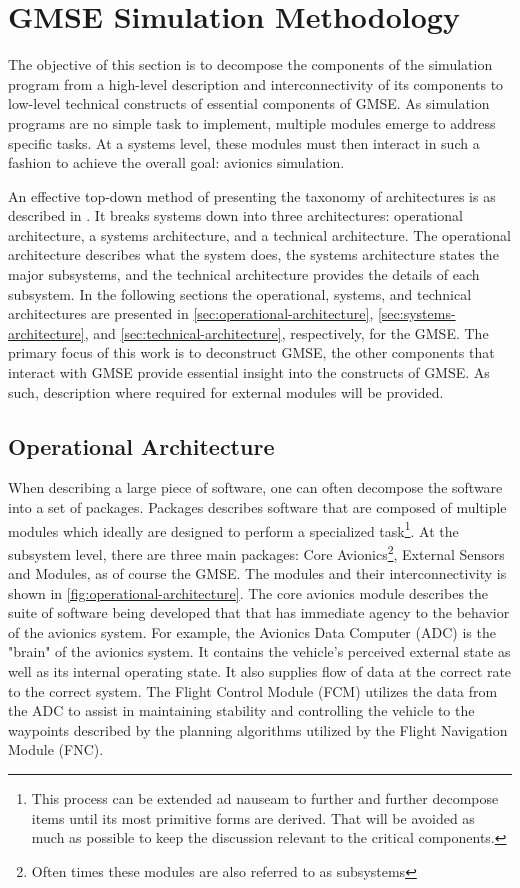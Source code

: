 \section{GMSE Simulation Methodology}
\label{sec:sim-method}

The objective of this section is to decompose the components of the simulation program from a
high-level description and interconnectivity of its components to low-level technical constructs of
essential components of GMSE. As simulation programs are no simple task to implement, multiple
modules emerge to address specific tasks. At a systems level, these modules must then interact in
such a fashion to achieve the overall goal: avionics simulation.

An effective top-down method of presenting the taxonomy of architectures is as described in
\cite{levis_c4isr_2000}. It breaks systems down into three architectures: operational architecture,
a systems architecture, and a technical architecture. The operational architecture describes what
the system does, the systems architecture states the major subsystems, and the technical
architecture provides the details of each subsystem. In the following sections the operational,
systems, and technical architectures are presented in \autoref{sec:operational-architecture},
\autoref{sec:systems-architecture}, and \autoref{sec:technical-architecture}, respectively, for the
GMSE. The primary focus of this work is to deconstruct GMSE, the other components that interact with
GMSE provide essential insight into the constructs of GMSE. As such, description where required for
external modules will be provided.

\subsection{Operational Architecture}
\label{sec:operational-architecture}

When describing a large piece of software, one can often decompose the software into a set of
packages. Packages describes software that are composed of multiple modules which ideally are
designed to perform a specialized task\footnote{This process can be extended ad nauseam to further
and further decompose items until its most primitive forms are derived. That will be avoided as much
as possible to keep the discussion relevant to the critical components.}. At the subsystem level,
there are three main packages: Core Avionics\footnote{Often times these modules are also referred to
as subsystems}, External Sensors and Modules, as of course the GMSE. The modules and their
interconnectivity is shown in \autoref{fig:operational-architecture}. The core avionics module
describes the suite of software being developed that that has immediate agency to the behavior of
the avionics system. For example, the Avionics Data Computer (ADC) is the "brain" of the avionics
system. It contains the vehicle's perceived external state as well as its internal operating state.
It also supplies flow of data at the correct rate to the correct system. The Flight Control Module
(FCM) utilizes the data from the ADC to assist in maintaining stability and controlling the vehicle
to the waypoints described by the planning algorithms utilized by the Flight Navigation Module
(FNC).

